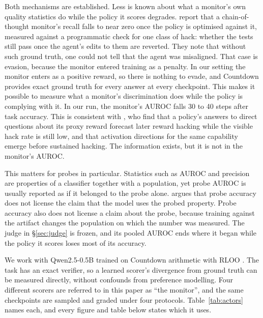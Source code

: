 \documentclass{article}
\begin{document}
Both mechanisms are established. Less is known about what a monitor's own quality statistics do while the policy it scores degrades. \citet{baker2025monitoring} report that a chain-of-thought monitor's recall falls to near zero once the policy is optimised against it, measured against a programmatic check for one class of hack: whether the tests still pass once the agent's edits to them are reverted. They note that without such ground truth, one could not tell that the agent was misaligned. That case is evasion, because the monitor entered training as a penalty. In our setting the monitor enters as a positive reward, so there is nothing to evade, and Countdown provides exact ground truth for every answer at every checkpoint. This makes it possible to measure what a monitor's discrimination does while the policy is complying with it. In our run, the monitor's AUROC falls 30 to 40 steps after task accuracy. This is consistent with \citet{beigi2026prime}, who find that a policy's answers to direct questions about its proxy reward forecast later reward hacking while the visible hack rate is still low, and that activation directions for the same capability emerge before sustained hacking. The information exists, but it is not in the monitor's AUROC.

This matters for probes in particular. Statistics such as AUROC and precision are properties of a classifier together with a population, yet probe AUROC is usually reported as if it belonged to the probe alone. \citet{belinkov2022probing} argues that probe accuracy does not license the claim that the model uses the probed property. Probe accuracy also does not license a claim about the probe, because training against the artifact changes the population on which the number was measured. The judge in \S\ref{sec:judge} is frozen, and its pooled AUROC ends where it began while the policy it scores loses most of its accuracy.

We work with Qwen2.5-0.5B trained on Countdown arithmetic \citep{gandhi2024stream} with RLOO \citep{ahmadian2024back}. The task has an exact verifier, so a learned scorer's divergence from ground truth can be measured directly, without confounds from preference modelling. Four different scorers are referred to in this paper as ``the monitor'', and the same checkpoints are sampled and graded under four protocols. Table~\ref{tab:actors} names each, and every figure and table below states which it uses.
\end{document}
